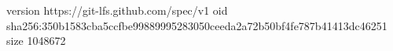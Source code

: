 version https://git-lfs.github.com/spec/v1
oid sha256:350b1583cba5ccfbe99889995283050ceeda2a72b50bf4fe787b41413dc46251
size 1048672

